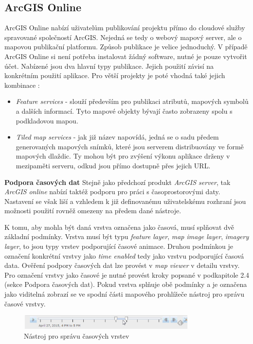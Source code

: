 \subsection{ArcGIS Online}

ArcGIS Online nabízí uživatelům publikování projektu přímo do cloudové
služby spravované společností ArcGIS. Nejedná se tedy o webový mapový server, ale o mapovou publikační platformu.
Způsob publikace je velice jednoduchý. V případě ArcGIS Online si není potřeba instalovat žádný software, nutné
je pouze vytvořit účet. Nabízené jsou dva hlavní typy
publikace. Jejich použití závisí na konkrétním použití aplikace. Pro
větší projekty je poté vhodná také jejich kombinace
\cite{arcgis-publishing-service}:
\begin{itemize}
	\item \textit{Feature services} - slouží především pro
publikaci atributů, mapových symbolů a dalších informací. Tyto mapové
objekty bývají často zobrazeny spolu s podkladovou mapou.
	\item \textit{Tiled map services} - jak již název napovídá,
jedná se o sadu předem generovaných mapových snímků, které jsou
serverem distribuovány ve formě mapových dlaždic. Ty mohou být pro
zvýšení výkonu aplikace drženy v mezipaměti serveru, odkud jsou přímo
dostupně přes jejich URL.
\end{itemize}

\bigskip
\noindent \textbf{Podpora časových dat} Stejně jako předchozí produkt
\textit{ArcGIS server}, tak \textit{ArcGIS online} nabízí taktéž
podporu pro práci s časoprostorovými daty. Nastavení se však liší a
vzhledem k již definovanému uživatelskému rozhraní jsou možnosti
použití rovněž omezeny na předem dané nástroje.

K tomu, aby mohla být daná vrstva označena jako časová, musí splňovat
dvě základní podmínky. Vrstva musí být typu \textit{feature layer},
\textit{map image layer}, \textit{imagery layer}, to jsou typy vrstev
podporující časové animace. Druhou podmínkou je označení konkrétní
vrstvy jako \textit{time enabled} tedy jako vrstvu podporující časová
data. Ověření podpory časových dat lze provést v \textit{map viewer} v
detailu vrstvy. Pro označení vrstvy jako časové je nutné provést kroky
popsané v podkapitole 2.4 (sekce Podpora časových dat). Pokud vrstva
splňuje obě podmínky a je označena jako viditelná zobrazí se ve spodní
části mapového prohlížeče nástroj pro správu časové vrstvy.

\begin{figure}[h!]  \centering
\includegraphics[width=0.8\textwidth]{../img/arcgis-online-time-slider.png}
	\caption{Nástroj pro správu časových vrstev}
	\label{fig:arcgis-time-slider}
\end{figure}

